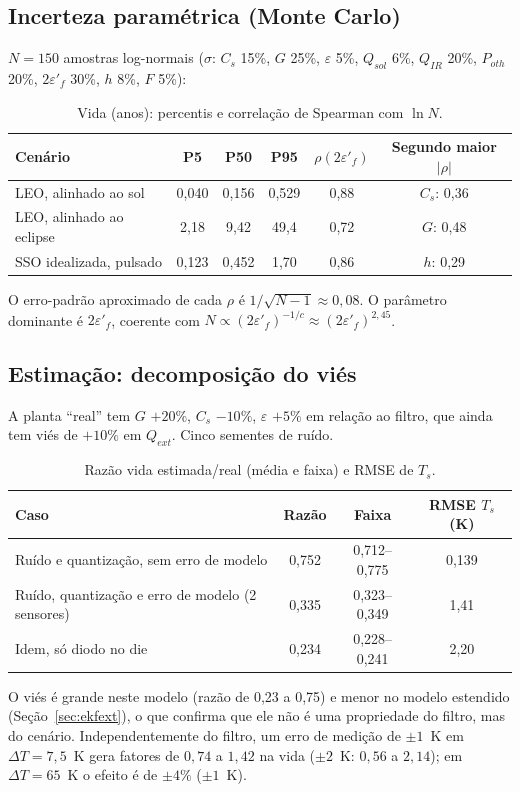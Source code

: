 \documentclass[12pt,a4paper]{article}
\begin{document}
\subsection{Incerteza paramétrica (Monte Carlo)}\label{sec:mc}
$N=150$ amostras log-normais ($\sigma$: $C_s$ 15\%, $G$ 25\%, $\varepsilon$ 5\%,
$Q_{sol}$ 6\%, $Q_{IR}$ 20\%, $P_{oth}$ 20\%, $2\varepsilon'_f$ 30\%, $h$ 8\%,
$F$ 5\%):
\begin{table}[h]\centering\small
\caption{Vida (anos): percentis e correlação de Spearman com $\ln N$.}
\begin{tabular}{@{}lccccc@{}}\toprule
Cenário & P5 & P50 & P95 & $\rho(2\varepsilon'_f)$ & Segundo maior $|\rho|$\\\midrule
LEO, alinhado ao sol & 0,040 & 0,156 & 0,529 & 0,88 & $C_s$: 0,36\\
LEO, alinhado ao eclipse & 2,18 & 9,42 & 49,4 & 0,72 & $G$: 0,48\\
SSO idealizada, pulsado & 0,123 & 0,452 & 1,70 & 0,86 & $h$: 0,29\\
\bottomrule\end{tabular}\end{table}
O erro-padrão aproximado de cada $\rho$ é $1/\sqrt{N-1}\approx0{,}08$. O
parâmetro dominante é $2\varepsilon'_f$, coerente com
$N\propto(2\varepsilon'_f)^{-1/c}\approx(2\varepsilon'_f)^{2{,}45}$.

\subsection{Estimação: decomposição do viés}\label{sec:ekf}
A planta ``real'' tem $G$ $+20\%$, $C_s$ $-10\%$, $\varepsilon$ $+5\%$ em relação
ao filtro, que ainda tem viés de $+10\%$ em $Q_{ext}$. Cinco sementes de ruído.
\begin{table}[h]\centering\small
\caption{Razão vida estimada/real (média e faixa) e RMSE de $T_s$.}
\begin{tabular}{@{}lccc@{}}\toprule
Caso & Razão & Faixa & RMSE $T_s$ (K)\\\midrule
Ruído e quantização, sem erro de modelo & 0,752 & 0,712--0,775 & 0,139\\
Ruído, quantização e erro de modelo (2 sensores) & 0,335 & 0,323--0,349 & 1,41\\
Idem, só diodo no die & 0,234 & 0,228--0,241 & 2,20\\
\bottomrule\end{tabular}\end{table}
O viés é grande neste modelo (razão de 0,23 a 0,75) e menor no modelo estendido
(Seção~\ref{sec:ekfext}), o que confirma que ele não é uma propriedade do
filtro, mas do cenário. Independentemente do filtro, um erro de medição de
$\pm1$~K em $\Delta T=7{,}5$~K gera fatores de $0{,}74$ a $1{,}42$ na vida
($\pm2$~K: $0{,}56$ a $2{,}14$); em $\Delta T=65$~K o efeito é de $\pm4\%$
($\pm1$~K).
\end{document}
